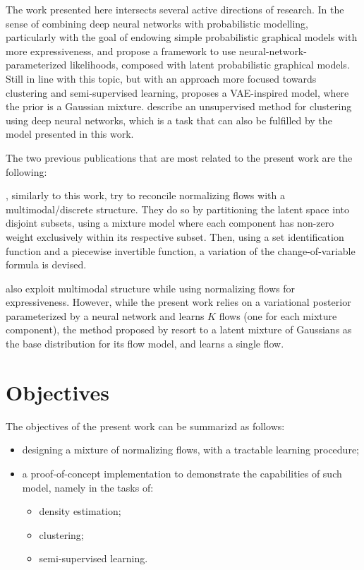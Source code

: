 The work presented here intersects several active directions of research.
In the sense of combining deep neural networks with probabilistic modelling,
particularly with the goal of endowing simple probabilistic graphical models
with more expressiveness, \textcite{svae} and \textcite{lin2018variational} propose a
framework to use neural-network-parameterized likelihoods, composed with latent
probabilistic graphical models. Still in line with this topic, but with an
approach more focused towards clustering and semi-supervised learning, \textcite{gmVAE}
proposes a VAE-inspired model, where the prior is a Gaussian mixture. \textcite{DEC}
describe an unsupervised method for clustering using deep neural networks, which
is a task that can also be fulfilled by the model presented in this work.

The two previous publications that are most related to the present work are
the following:

\textcite{RAD}, similarly to this work, try to reconcile normalizing flows with a
multimodal/discrete structure. They do so by partitioning the latent space into
disjoint subsets, using a mixture model where each component has non-zero
weight exclusively within its respective subset. Then, using a set identification
function and a piecewise invertible function, a variation of the change-of-variable
formula is devised.

\textcite{semisuplearning_nflows} also exploit multimodal structure while
using normalizing flows for expressiveness. However, while the present work relies on
a variational posterior parameterized by a neural network and learns $K$ flows
(one for each mixture component), the method proposed by \textcite{semisuplearning_nflows} resort to a
latent mixture of Gaussians as the base distribution for its flow model, and
learns a single flow.

\section{Objectives}
\label{section:objectives}

The objectives of the present work can be summarizd as follows:
\begin{itemize}
    \item designing a mixture of normalizing flows, with a tractable learning procedure;
    \item a proof-of-concept implementation to demonstrate the capabilities of such model, namely in the tasks of:
        \begin{itemize}
        \item density estimation;
        \item clustering;
        \item semi-supervised learning.
        \end{itemize}
\end{itemize}

